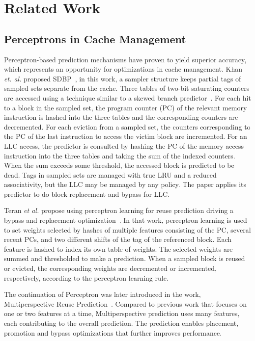 \section{Related Work}
\label{related}

\subsection{Perceptrons in Cache Management}

Perceptron-based prediction mechanisms have proven to yield superior accuracy, 
which represents an opportunity for optimizations in cache management. 
Khan \textit{et. al.} proposed SDBP~\cite{sdbp}, in this work, a sampler 
structure keeps partial tags of sampled sets separate from the cache. 
Three tables of two-bit saturating counters are accessed using a technique 
similar to a skewed branch predictor~\cite{Piece_Linear}. For each hit to 
a block in the sampled set, the program counter (PC) of the relevant memory 
instruction is hashed into the three tables and the corresponding counters 
are decremented. For each eviction from a sampled set, the counters corresponding 
to the PC of the last instruction to access the victim block are incremented. 
For an LLC access, the predictor is consulted by hashing the PC of the memory 
access instruction into the three tables and taking the sum of the indexed 
counters. When the sum exceeds some threshold, the accessed block is 
predicted to be dead. Tags in sampled sets are managed with true LRU and 
a reduced associativity, but the LLC may be managed by any policy. 
The paper applies its predictor to do block replacement and bypass for LLC.

Teran \textit{et al.} propose using perceptron learning for reuse prediction 
driving a bypass and replacement optimization~\cite{Perc_Reuse}. In that work, 
perceptron learning is used to set weights selected by hashes of multiple features 
consisting of the PC, several recent PCs, and two different shifts of the tag 
of the referenced block. Each feature is hashed to index its own table of weights. 
The selected weights are summed and thresholded to make a prediction. When a sampled 
block is reused or evicted, the corresponding weights are decremented or incremented, 
respectively, according to the perceptron learning rule. 

The continuation of Perceptron was later introduced in the work, Multiperspective Reuse 
Prediction~\cite{Multiperspective}. Compared to previous work that focuses on one or two 
features at a time, Multiperspective prediction uses many features, each contributing 
to the overall prediction. The prediction enables placement, promotion and bypass 
optimizations that further improves performance.

